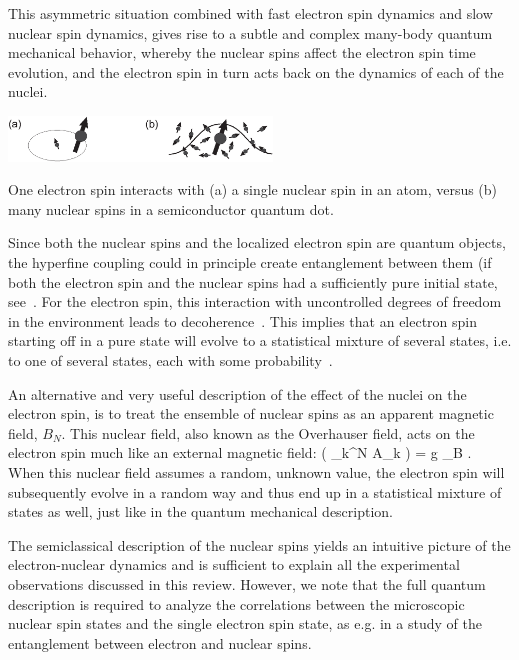 \documentclass[rmp,twocolumn,aps]{revtex4}
\begin{document}
This asymmetric situation combined with fast electron spin dynamics and slow nuclear spin dynamics, gives rise to a subtle and complex many-body quantum mechanical behavior, whereby the nuclear spins affect the electron spin time evolution, and the electron spin in turn acts back on the dynamics of each of the nuclei.

\bfig
\begin{center}
\includegraphics[width=7cm]{hanson_fig24.eps}
\end{center}
\caption{One electron spin interacts with (a) a single nuclear
spin in an atom, versus (b) many nuclear spins in a semiconductor
quantum dot.} \label{fig:hyperfine} \efig

Since both the nuclear spins and the localized electron spin are quantum objects, the hyperfine coupling could in principle create entanglement between them (if both the electron spin and the nuclear spins had a sufficiently pure initial state, see~\textcite{braunstein99}. For the electron spin, this interaction with
uncontrolled degrees of freedom in the environment leads to decoherence~\cite{merkulov02,khaetskii02,khaetskii03,coish04}. This implies that an electron spin starting off in a pure state will
evolve to a statistical mixture of several states, i.e. to one of
several states, each with some probability~\cite{nielsen00}.

An alternative and very useful description of the effect of the
nuclei on the electron spin, is to treat the ensemble of nuclear
spins as an apparent magnetic field, $B_N$. This nuclear
field, also known as the Overhauser field, acts on the electron
spin much like an external magnetic field: 
\be 
\left( \sum_k^N A_k \right) 
= g \mu_B   \;.
\label{eq:H_HF_class} 
\ee 
When this nuclear field assumes a random, unknown value, the electron spin will subsequently evolve in a random way and thus end up in a statistical mixture of states as well, just like in the quantum mechanical description.

The semiclassical description of the nuclear spins yields an intuitive
picture of the electron-nuclear dynamics and is sufficient to explain all the experimental observations discussed in this review. However, we note that the full quantum description is required to analyze the correlations between the microscopic nuclear spin states and the single electron spin state, as e.g. in a study of the entanglement between electron and nuclear spins.
\end{document}

